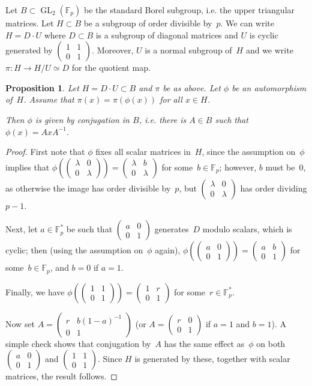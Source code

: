 \documentclass[twoside,leqno,symbols-for-thanks, draft]{rmi}
\numberwithin{equation}{section}
\newcommand{\Fp}{\mathbb{F}_p}
\newcommand{\Fpstar}{\mathbb{F}_p^*}
\newcommand{\GL}{\operatorname{GL}}
\newcommand{\mat}[4]{{\left(\begin{smallmatrix} #1 & #2 \\ #3 & #4 \end{smallmatrix} \right)}}
\newtheorem{proposition}[theorem]{Proposition}
\theoremstyle{remark}
\begin{document}
Let $B \subset \GL_2(\Fp)$ be the standard Borel subgroup, i.e. the
upper triangular matrices. Let $H \subset B$ be a subgroup of order
divisible by~$p$.  We can write~$H = D\cdot U$ where $D \subset B$ is
a subgroup of diagonal matrices and $U$ is cyclic generated by
$\mat{1}{1}{0}{1}$.  Moreover, $U$ is a normal subgroup of~$H$ and we
write $\pi : H \to H/U \simeq D$ for the quotient map.

\begin{proposition} \label{P:inner}
Let $H = D \cdot U \subset B$ and $\pi$ be as above. 
Let $\phi$ be an automorphism of~$H$. Assume that  
$\pi(x) = \pi(\phi(x))$ for all $x \in H$. 

Then $\phi$ is given by conjugation in $B$, i.e. there is $A \in B$ such that $\phi(x) = AxA^{-1}$. 
\end{proposition}
\begin{proof}
First note that $\phi$ fixes all scalar matrices in~$H$, since the
assumption on~$\phi$ implies that $\phi(\mat{\lambda}{0}{0}{\lambda})
= \mat{\lambda}{b}{0}{\lambda}$ for some~$b\in\Fp$; however, $b$ must
be~$0$, as otherwise the image has order divisible by~$p$, but $\mat{\lambda}{0}{0}{\lambda}$ has order dividing $p-1$.

Next, let $a\in\Fpstar$ be such that $\mat{a}{0}{0}{1}$ generates~$D$
modulo scalars, which is cyclic; then (using the assumption on~$\phi$
again), $\phi(\mat{a}{0}{0}{1}) = \mat{a}{b}{0}{1}$ for
some~$b\in\Fp$, and $b=0$ if $a=1$.

Finally, we have $\phi(\mat{1}{1}{0}{1}) = \mat{1}{r}{0}{1}$ for
some~$r\in\Fpstar$.

Now set $A=\mat{r}{b(1-a)^{-1}}{0}{1}$ (or $A=\mat{r}{0}{0}{1}$ if
$a=1$ and $b=1$).  A simple check shows that conjugation by~$A$ has
the same effect as~$\phi$ on both $\mat{a}{0}{0}{1}$ and
$\mat{1}{1}{0}{1}$.  Since $H$ is generated by these, together with
scalar matrices, the result follows.
\end{proof}
\end{document}
